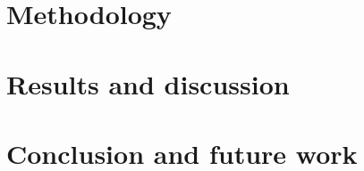 \documentclass{ifri}
\begin{document}
\chapter{Methodology}\label{chap:methodology}


\chapter{Results and discussion}\label{chap:results-discussion}


\chapter{Conclusion and future work}\label{chap:conclusion-future-work}

%
\lhead[]{} \rhead[]{} \chead[]{}




\appendix


\newpage
\tableofcontents
\end{document}
